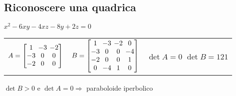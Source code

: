 \subsection{Riconoscere una quadrica}

$x^2 - 6xy - 4xz - 8y + 2z = 0$

\begin{tabularx}{\textwidth}{llX}
	$
		A = \left[
		\arraycolsep=2.0pt\def\arraystretch{1.0}
		\begin{array}{@{}ccc@{}}
			1 & -3 & -2 \\
			-3 & 0 & 0 \\
			-2 & 0 & 0 \\
		\end{array}
		\right]
	$ &
	$
		B = \left[
		\arraycolsep=2.0pt\def\arraystretch{1.0}
		\begin{array}{@{}cccc@{}}
			1 & -3 & -2 & 0 \\
			-3 & 0 & 0 & -4 \\
			-2 & 0 & 0 & 1 \\
			0 & -4 & 1 & 0
		\end{array}
		\right]
	$ &
	$\det A = 0$ \newline
	$\det B = 121$ \newline
\end{tabularx}

$\det B > 0$ e $\det A = 0 \Rightarrow$ paraboloide iperbolico
